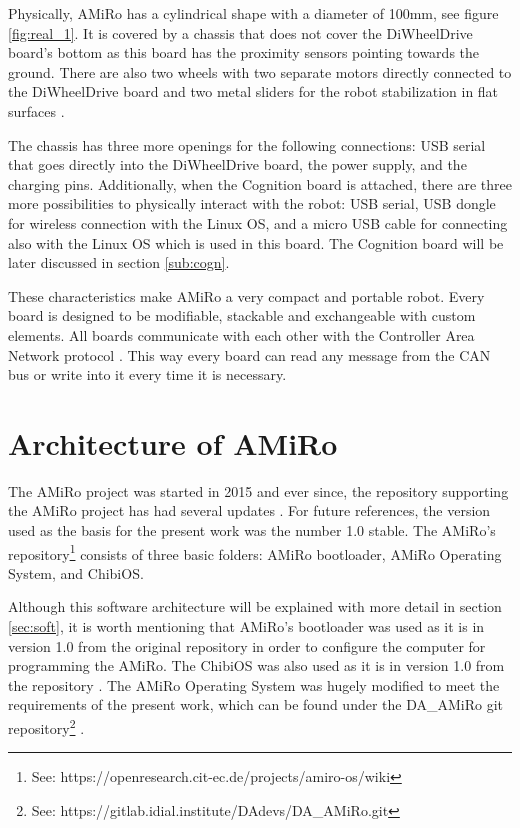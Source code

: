 \documentclass[12pt]{report}%
\begin{document}
Physically, AMiRo has a cylindrical shape with a diameter of 100mm, see figure \ref{fig:real_1}. It is covered by a chassis that does not cover the DiWheelDrive board's bottom as this board has the proximity sensors pointing towards the ground. There are also two wheels with two separate motors directly connected to the DiWheelDrive board and two metal sliders for the robot stabilization in flat surfaces \cite{AMiRo_paper_modular}.

The chassis has three more openings for the following connections: USB serial that goes directly into the DiWheelDrive board, the power supply, and the charging pins. Additionally, when the Cognition board is attached, there are three more possibilities to physically interact with the robot: USB serial, USB dongle for wireless connection with the Linux OS, and a micro USB cable for connecting also with the Linux OS which is used in this board. The Cognition board will be later discussed in section \ref{sub:cogn}.

These characteristics make AMiRo a very compact and portable robot. Every board is designed to be modifiable, stackable and exchangeable with custom elements. All boards communicate with each other with the Controller Area Network protocol \cite{AMiRo_paper_modular}. This way every board can read any message from the CAN bus or write into it every time it is necessary.

\chapter{Architecture of AMiRo}
The AMiRo project was started in 2015 and ever since, the repository supporting the AMiRo project has had several updates \cite{AMiRo_Wiki}. For future references, the version used as the basis for the present work was the number 1.0 stable. The AMiRo's repository\footnote{See: https://openresearch.cit-ec.de/projects/amiro-os/wiki} consists of three basic folders: AMiRo bootloader, AMiRo Operating System, and ChibiOS.

Although this software architecture will be explained with more detail in section \ref{sec:soft}, it is worth mentioning that AMiRo's bootloader was used as it is in version 1.0 from the original repository in order to configure the computer for programming the AMiRo. The ChibiOS was also used as it is in version 1.0 from the repository \cite{AMiRo_Wiki}. The AMiRo Operating System was hugely modified to meet the requirements of the present work, which can be found under the DA\_AMiRo git repository\footnote{See: https://gitlab.idial.institute/DAdevs/DA\_AMiRo.git} \cite{AMiRo_Git}.
\end{document}
